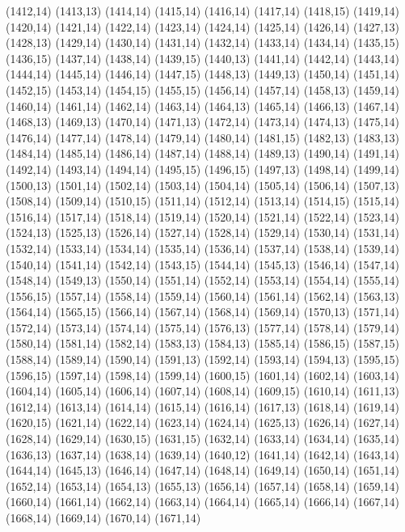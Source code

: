 (1412,14)
(1413,13)
(1414,14)
(1415,14)
(1416,14)
(1417,14)
(1418,15)
(1419,14)
(1420,14)
(1421,14)
(1422,14)
(1423,14)
(1424,14)
(1425,14)
(1426,14)
(1427,13)
(1428,13)
(1429,14)
(1430,14)
(1431,14)
(1432,14)
(1433,14)
(1434,14)
(1435,15)
(1436,15)
(1437,14)
(1438,14)
(1439,15)
(1440,13)
(1441,14)
(1442,14)
(1443,14)
(1444,14)
(1445,14)
(1446,14)
(1447,15)
(1448,13)
(1449,13)
(1450,14)
(1451,14)
(1452,15)
(1453,14)
(1454,15)
(1455,15)
(1456,14)
(1457,14)
(1458,13)
(1459,14)
(1460,14)
(1461,14)
(1462,14)
(1463,14)
(1464,13)
(1465,14)
(1466,13)
(1467,14)
(1468,13)
(1469,13)
(1470,14)
(1471,13)
(1472,14)
(1473,14)
(1474,13)
(1475,14)
(1476,14)
(1477,14)
(1478,14)
(1479,14)
(1480,14)
(1481,15)
(1482,13)
(1483,13)
(1484,14)
(1485,14)
(1486,14)
(1487,14)
(1488,14)
(1489,13)
(1490,14)
(1491,14)
(1492,14)
(1493,14)
(1494,14)
(1495,15)
(1496,15)
(1497,13)
(1498,14)
(1499,14)
(1500,13)
(1501,14)
(1502,14)
(1503,14)
(1504,14)
(1505,14)
(1506,14)
(1507,13)
(1508,14)
(1509,14)
(1510,15)
(1511,14)
(1512,14)
(1513,14)
(1514,15)
(1515,14)
(1516,14)
(1517,14)
(1518,14)
(1519,14)
(1520,14)
(1521,14)
(1522,14)
(1523,14)
(1524,13)
(1525,13)
(1526,14)
(1527,14)
(1528,14)
(1529,14)
(1530,14)
(1531,14)
(1532,14)
(1533,14)
(1534,14)
(1535,14)
(1536,14)
(1537,14)
(1538,14)
(1539,14)
(1540,14)
(1541,14)
(1542,14)
(1543,15)
(1544,14)
(1545,13)
(1546,14)
(1547,14)
(1548,14)
(1549,13)
(1550,14)
(1551,14)
(1552,14)
(1553,14)
(1554,14)
(1555,14)
(1556,15)
(1557,14)
(1558,14)
(1559,14)
(1560,14)
(1561,14)
(1562,14)
(1563,13)
(1564,14)
(1565,15)
(1566,14)
(1567,14)
(1568,14)
(1569,14)
(1570,13)
(1571,14)
(1572,14)
(1573,14)
(1574,14)
(1575,14)
(1576,13)
(1577,14)
(1578,14)
(1579,14)
(1580,14)
(1581,14)
(1582,14)
(1583,13)
(1584,13)
(1585,14)
(1586,15)
(1587,15)
(1588,14)
(1589,14)
(1590,14)
(1591,13)
(1592,14)
(1593,14)
(1594,13)
(1595,15)
(1596,15)
(1597,14)
(1598,14)
(1599,14)
(1600,15)
(1601,14)
(1602,14)
(1603,14)
(1604,14)
(1605,14)
(1606,14)
(1607,14)
(1608,14)
(1609,15)
(1610,14)
(1611,13)
(1612,14)
(1613,14)
(1614,14)
(1615,14)
(1616,14)
(1617,13)
(1618,14)
(1619,14)
(1620,15)
(1621,14)
(1622,14)
(1623,14)
(1624,14)
(1625,13)
(1626,14)
(1627,14)
(1628,14)
(1629,14)
(1630,15)
(1631,15)
(1632,14)
(1633,14)
(1634,14)
(1635,14)
(1636,13)
(1637,14)
(1638,14)
(1639,14)
(1640,12)
(1641,14)
(1642,14)
(1643,14)
(1644,14)
(1645,13)
(1646,14)
(1647,14)
(1648,14)
(1649,14)
(1650,14)
(1651,14)
(1652,14)
(1653,14)
(1654,13)
(1655,13)
(1656,14)
(1657,14)
(1658,14)
(1659,14)
(1660,14)
(1661,14)
(1662,14)
(1663,14)
(1664,14)
(1665,14)
(1666,14)
(1667,14)
(1668,14)
(1669,14)
(1670,14)
(1671,14)
